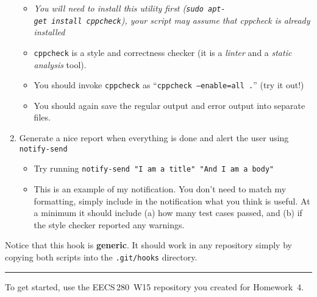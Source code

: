 \documentclass{article}
\begin{document}
\begin{enumerate}
    \begin{itemize}
      \item \emph{\small You will need to install this utility first
        (\texttt{sudo~apt-get~install~cppcheck}), your script may assume that
        cppcheck is already installed}
      \item \texttt{cppcheck} is a style and correctness checker (it is a
        \emph{linter} and a \emph{static analysis} tool).
      \item You should invoke \texttt{cppcheck} as
        ``\texttt{cppcheck~--enable=all~.}'' (try it out!)
      \item You should again save the regular output and error output into
        separate files.
    \end{itemize}
  \item Generate a nice report when everything is done and alert the user
    using \texttt{notify-send}\\
    \begin{minipage}{0.6\textwidth}
      \begin{itemize}
        \item Try running \texttt{notify-send "I am a title" "And I am a body"}
        \item This is an example of my notification. You don't need to match my
          formatting, simply include in the notification what you think is
          useful. At a minimum it should include (a) how many test cases passed,
          and (b) if the style checker reported any warnings.
      \end{itemize}
    \end{minipage}
    \hfill
    \begin{minipage}{0.3\textwidth}
    \end{minipage}
\end{enumerate}

\medskip
\noindent
Notice that this hook is \textbf{generic}. It should work in any repository
simply by copying both scripts into the \texttt{.git/hooks} directory.

\bigskip
\hrule
\bigskip

\medskip
\noindent
To get started, use the EECS\,280~W15 repository you created for Homework~4.
\end{document}
